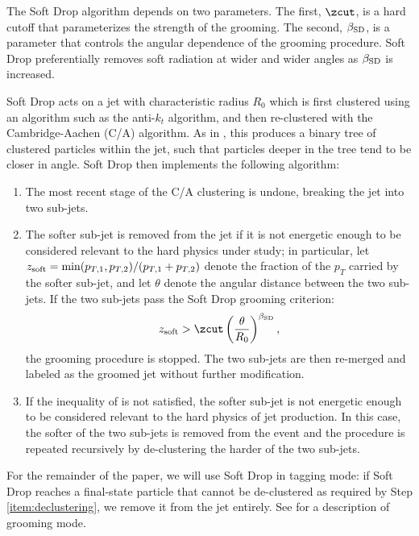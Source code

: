\documentclass[letterpaper,11pt]{article}
\begin{document}
The Soft Drop algorithm depends on two parameters.
%
The first, \(\zcut\), is a hard cutoff that parameterizes the strength of the grooming.
%
The second, \(\beta_{\rm SD}\), is a parameter that controls the angular dependence of the grooming procedure.
%
Soft Drop preferentially removes soft radiation at wider and wider angles as \(\beta_{\rm SD}\) is increased.

Soft Drop acts on a jet with characteristic radius \(R_0\) which is first clustered using an algorithm such as the anti-\(k_t\) algorithm, and then re-clustered with the Cambridge-Aachen (C/A) algorithm.
%
As in , this produces a binary tree of clustered particles within the jet, such that particles deeper in the tree tend to be closer in angle.
%
Soft Drop then implements the following algorithm:
\begin{enumerate}
    \item
    \label{item:declustering}
    The most recent stage of the C/A clustering is undone, breaking the jet into two sub-jets.

    \item
    The softer sub-jet is removed from the jet if it is not energetic enough to be considered relevant to the hard physics under study;
    in particular, let \(z_{\rm soft} = \min(p_{T,1}, p_{T,2})/(p_{T,1} + p_{T,2})\) denote the fraction of the \(p_T\) carried by the softer sub-jet, and let \(\theta\) denote the angular distance between the two sub-jets.
    If the two sub-jets pass the Soft Drop grooming criterion:
     \begin{align}
        z_{\rm soft} > \zcut \left(\frac{\theta}{R_0}\right)^{\beta_{\rm SD}}
        \label{eqn:softdropcriterion}
        ,
    \end{align}
    the grooming procedure is stopped.
    The two sub-jets are then re-merged and labeled as the groomed jet without further modification.

    \item
    If the inequality of  is not satisfied, the softer sub-jet is not energetic enough to be considered relevant to the hard physics of jet production.
    In this case, the softer of the two sub-jets is removed from the event and the procedure is repeated recursively by de-clustering the harder of the two sub-jets.
\end{enumerate}
%
For the remainder of the paper, we will use Soft Drop in tagging mode:
%
if Soft Drop reaches a final-state particle that cannot be de-clustered as required by Step \ref{item:declustering}, we remove it from the jet entirely.
%
See  for a description of grooming mode.
\end{document}
